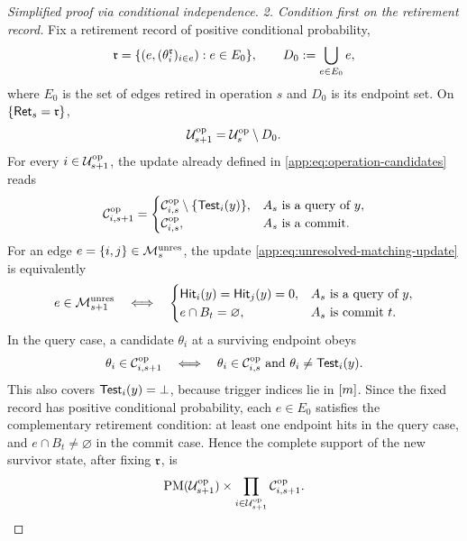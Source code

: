 {\begin{proof}[Simplified proof via conditional independence]
\emph{2. Condition first on the retirement record.}
Fix a retirement record of positive conditional probability,
\[
 \RetiredRecordValue
 =\{(e,(\theta_i^{\RetiredRecordValue})_{i\in e}):e\in E_0\},
 \qquad
 D_0:=\bigcup_{e\in E_0}e,
\]
where \(E_0\) is the set of edges retired in operation \(s\) and \(D_0\)
is its endpoint set.  On
\(\{\OpRetiredRecord{s}=\RetiredRecordValue\}\),
\[
 \OpUnresolvedVertices{s+1}
 =\OpUnresolvedVertices{s}\setminus D_0.
\]
For every \(i\in\OpUnresolvedVertices{s+1}\), the update already defined in
\eqref{app:eq:operation-candidates} reads
\[
 \OpRemainingTriggers{i}{s+1}=
 \begin{cases}
  \OpRemainingTriggers{i}{s}\setminus
       \{\HardTest{y}{i}\},&A_s\text{ is a query of }y,\\
  \OpRemainingTriggers{i}{s},&A_s\text{ is a commit}.
 \end{cases}
\]
For an edge \(e=\{i,j\}\in\OpUnresolvedMatching{s}\), the update
\eqref{app:eq:unresolved-matching-update} is equivalently
\[
 e\in\OpUnresolvedMatching{s+1}
 \quad\Longleftrightarrow\quad
 \begin{cases}
  \HardHit{y}{i}=\HardHit{y}{j}=0,
       &A_s\text{ is a query of }y,\\
  e\cap B_t=\varnothing,
       &A_s\text{ is commit }t.
 \end{cases}
\]
In the query case, a candidate \(\theta_i\) at a surviving endpoint obeys
\[
 \theta_i\in\OpRemainingTriggers{i}{s+1}
 \quad\Longleftrightarrow\quad
 \theta_i\in\OpRemainingTriggers{i}{s}
 \ \text{and}\
 \theta_i\ne\HardTest{y}{i}.
\]
This also covers \(\HardTest{y}{i}=\bot\), because trigger indices lie in
\([\HardBankSize]\).  Since the fixed record has positive conditional
probability, each \(e\in E_0\) satisfies the complementary retirement
condition: at least one endpoint hits in the query case, and
\(e\cap B_t\ne\varnothing\) in the commit case.
Hence the complete support of the new survivor state, after fixing
\(\RetiredRecordValue\), is
\[
 \operatorname{PM}(\OpUnresolvedVertices{s+1})
 \times
 \prod_{i\in\OpUnresolvedVertices{s+1}}
       \OpRemainingTriggers{i}{s+1}.
\]


\end{proof}}
